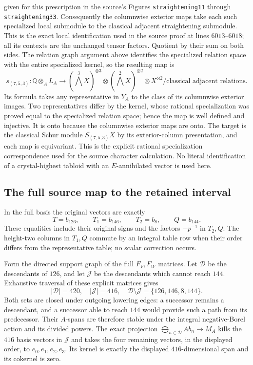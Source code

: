 given for this prescription in the source's Figures
\texttt{straightening11} through \texttt{straightening33}.
Consequently the columnwise exterior maps take each such
specialized local submodule to the classical adjacent
straightening submodule. This is the exact local
identification used in the source proof at lines
$6013$--$6018$; all its contexts are the unchanged tensor
factors. Quotient by their sum on both sides. The relation
graph argument above identifies the specialized relation
space with the entire specialized kernel, so the resulting
map is
\[
 s_{(7,5,3)}:\mathbb Q\otimes_A L_A
   \longrightarrow
 \left(\bigwedge^3X\right)^{\otimes3}
 \otimes\left(\bigwedge^2X\right)^{\otimes2}
 \otimes X^{\otimes2}\big/\text{classical adjacent relations}.
\]
Its formula takes any representative in $Y_A$ to the class
of its columnwise exterior images. Two representatives
differ by the kernel, whose rational specialization was
proved equal to the specialized relation space; hence the map is
well defined and injective. It is onto because the
columnwise exterior maps are onto. The target is the
classical Schur module $S_{(7,5,3)}X$ by its exterior-column
presentation, and each map is equivariant. This is the
explicit rational specialization correspondence used for
the source character calculation. No literal identification
of a crystal-highest tabloid with an $E$-annihilated vector
is used here.

\subsection{The full source map to the retained interval}

In the full basis the original vectors are exactly
\[
 T=b_{126},\qquad T_1=b_{146},\qquad T_2=b_8,\qquad Q=b_{144}.
\]
These equalities include their original signs and the factors
$-p^{-1}$ in $T_2,Q$. The height-two columns in $T_1,Q$
commute by an integral table row when their order differs
from the representative table; no scalar correction occurs.

Form the directed support graph of the full $F_V,F_W$
matrices. Let $\mathcal D$ be the descendants of $126$,
and let $\mathcal J$ be the descendants which cannot reach
$144$. Exhaustive traversal of these explicit matrices gives
\[
 |\mathcal D|=420,\quad |\mathcal J|=416,\quad
 \mathcal D\setminus\mathcal J=\{126,146,8,144\}.
\]
Both sets are closed under outgoing lowering edges: a
successor remains a descendant, and a successor able to
reach $144$ would provide such a path from its predecessor.
Their $A$-spans are therefore stable under the integral
negative-Borel action and its divided powers. The exact
projection $\bigoplus_{n\in\mathcal D}Ab_n\to M_A$ kills
the $416$ basis vectors in $\mathcal J$ and takes the four
remaining vectors, in the displayed order, to
$e_0,e_1,e_2,e_3$. Its kernel is exactly the displayed
$416$-dimensional span and its cokernel is zero.

